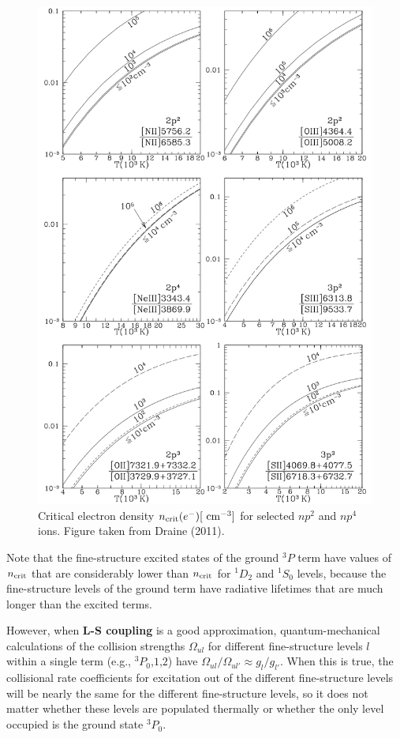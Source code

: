 \documentclass[a4paper,10pt]{article}
\begin{document}
\begin{figure}[t!]
    \centering
    \includegraphics[width=14cm]{figures/LineRatios_T.png}
    \caption{\footnotesize{Critical electron density $n_{\rm crit}(e^-)[~{\rm cm^{-3}}]$ for selected $np^2$ and $np^4$ ions. Figure taken from Draine (2011).}}
    \label{fig:lineratios_t}
\end{figure}

{\noindent}Note that the fine-structure excited states of the ground $^3P$ term have values of $n_{\rm crit}$ that are considerably lower than $n_{\rm crit}$ for $^1D_2$ and $^1S_0$ levels, because the fine-structure levels of the ground term have radiative lifetimes that are much longer than the excited terms.

{\noindent}However, when \textbf{L-S coupling} is a good approximation, quantum-mechanical calculations of the collision strengths $\Omega_{ul}$ for different fine-structure levels $l$ within a single term (e.g., $^3P_0$,$1$,$2$) have $\Omega_{ul}/\Omega_{ul'}\approx g_l/g_{l'}$. When this is true, the collisional rate coefficients for excitation out of the different fine-structure levels will be nearly the same for the different fine-structure levels, so it does not matter whether these levels are populated thermally or whether the only level occupied is the ground state $^3P_0$.
\end{document}
